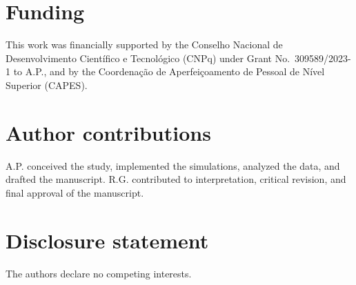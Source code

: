 \documentclass[12pt]{article}
\begin{document}
\section*{Funding}
This work was financially supported by the Conselho Nacional de Desenvolvimento Cient\'ifico e Tecnol\'ogico (CNPq) under Grant No.~309589/2023-1 to A.P., and by the Coordena\c{c}\~ao de Aperfei\c{c}oamento de Pessoal de N\'ivel Superior (CAPES).

\section*{Author contributions}
A.P. conceived the study, implemented the simulations, analyzed the data, and drafted the manuscript. R.G. contributed to interpretation, critical revision, and final approval of the manuscript.

\section*{Disclosure statement}
The authors declare no competing interests.



\end{document}

